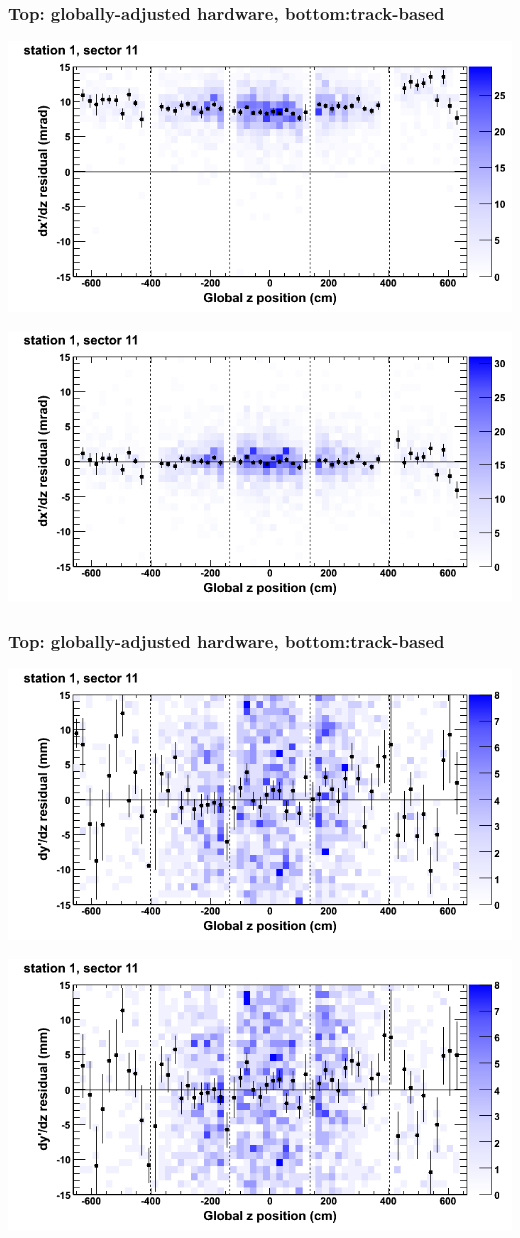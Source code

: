 \documentclass[compress]{beamer}
\begin{document}
\begin{frame}
\frametitle{Top: globally-adjusted hardware, bottom:track-based}
\includegraphics[width=0.7\linewidth]{NOV4_mapplots_HW/DTvsz_st1sec11_dxdz.png}

\includegraphics[width=0.7\linewidth]{NOV4_mapplots/DTvsz_st1sec11_dxdz.png}
\end{frame}

\begin{frame}
\frametitle{Top: globally-adjusted hardware, bottom:track-based}
\includegraphics[width=0.7\linewidth]{NOV4_mapplots_HW/DTvsz_st1sec11_dydz.png}

\includegraphics[width=0.7\linewidth]{NOV4_mapplots/DTvsz_st1sec11_dydz.png}
\end{frame}
\end{document}
